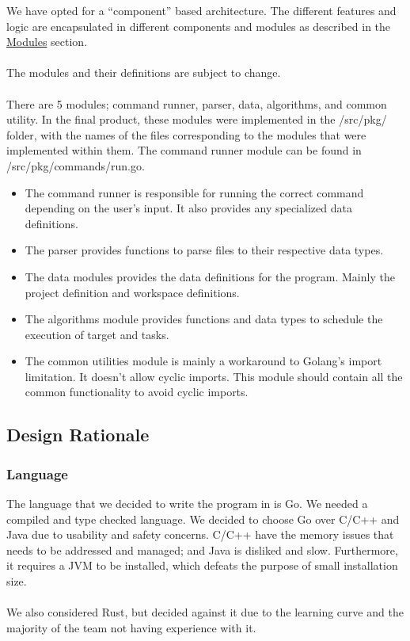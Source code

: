 \documentclass[11pt]{article}
\begin{document}
We have opted for a ``component'' based architecture. The different features and
logic are encapsulated in different components and modules as described in the
\hyperref[sec:modules]{Modules} section.
\\\\
The modules and their definitions are subject to change.
\\\\
There are 5 modules; command runner, parser, data, algorithms, and common
utility. In the final product, these modules were implemented in the /src/pkg/ folder, with the names of the files corresponding to the modules that were implemented within them. The command runner module can be found in /src/pkg/commands/run.go.

\begin{itemize}
\item The command runner is responsible for running the correct command
  depending on the user's input. It also provides any specialized data definitions.

\item The parser provides functions to parse files to their respective data types.

\item The data modules provides the data definitions for the program. Mainly the
  \gls{project definition} and workspace definitions.

\item The algorithms module provides functions and data types to schedule the
  execution of \gls{target} and tasks.

\item The common utilities module is mainly a workaround to Golang's import
  limitation. It doesn't allow cyclic imports. This module should contain all
  the common functionality to avoid cyclic imports.
\end{itemize}

\subsection{Design Rationale}
\subsubsection{Language}
\label{sec:lang}

The language that we decided to write the program in is Go. We needed a compiled
and type checked language. We decided to choose Go over C/C++ and Java due to usability and
safety concerns. C/C++ have the memory issues that needs to be addressed and managed; and
Java is disliked and slow. Furthermore, it requires a JVM to be installed, which
defeats the purpose of small installation size.
\\\\
We also considered Rust, but decided against it due to the learning curve and
the majority of the team not having experience with it.
\end{document}
